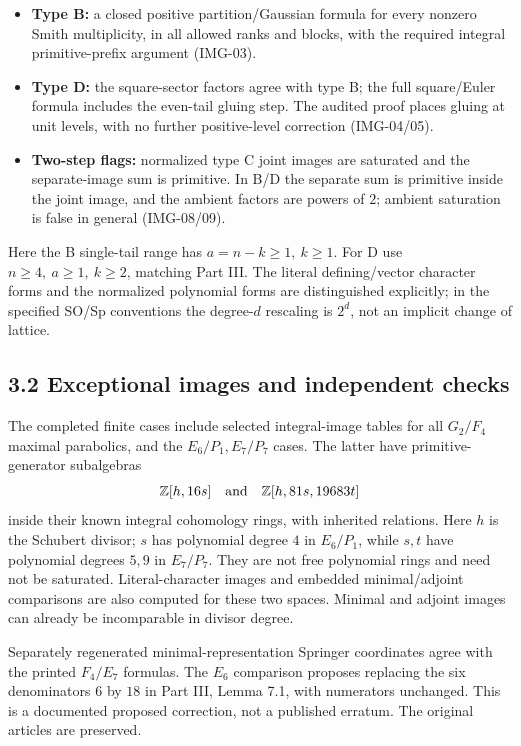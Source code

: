 \documentclass[11pt,letterpaper]{article}
\newcommand{\Z}{\mathbb Z}
\begin{document}
\begin{itemize}
\item \textbf{Type B:} a closed positive partition/Gaussian formula for every
nonzero Smith multiplicity, in all allowed ranks and blocks, with the
required integral primitive-prefix argument (IMG-03).
\item \textbf{Type D:} the square-sector factors agree with type B; the full
square/Euler formula includes the even-tail gluing step. The audited proof
places gluing at unit levels, with no further positive-level correction
(IMG-04/05).
\item \textbf{Two-step flags:} normalized type C joint images are saturated
and the separate-image sum is primitive. In B/D the separate sum is primitive
inside the joint image, and the ambient factors are powers of \(2\);
ambient saturation is false in general (IMG-08/09).
\end{itemize}
Here the B single-tail range has \(a=n-k\ge1,\ k\ge1\).
For D use \(n\ge4,\ a\ge1,\ k\ge2\), matching Part III.
The literal defining/vector character forms and the normalized polynomial
forms are distinguished explicitly; in the specified SO/Sp conventions the
degree-\(d\) rescaling is \(2^d\), not an implicit change of lattice.

\subsection*{3.2 Exceptional images and independent checks}
The completed finite cases include selected integral-image tables for all
\(G_2/F_4\) maximal parabolics, and the \(E_6/P_1,E_7/P_7\) cases.
The latter have primitive-generator subalgebras
\[
 \Z[h,16s]\quad\hbox{and}\quad\Z[h,81s,19683t]
\]
inside their known integral cohomology rings, with inherited relations.
Here \(h\) is the Schubert divisor; \(s\) has polynomial degree \(4\) in
\(E_6/P_1\), while \(s,t\) have polynomial degrees \(5,9\) in \(E_7/P_7\).
They are not free polynomial rings and need not be saturated.
Literal-character images and embedded minimal/adjoint comparisons are
also computed for these two spaces. Minimal and adjoint images can already
be incomparable in divisor degree.

Separately regenerated minimal-representation Springer coordinates agree
with the printed \(F_4/E_7\) formulas. The \(E_6\) comparison proposes
replacing the six denominators \(6\) by \(18\) in Part III, Lemma 7.1,
with numerators unchanged. This is a documented proposed correction,
not a published erratum. The original articles are preserved.
\end{document}
